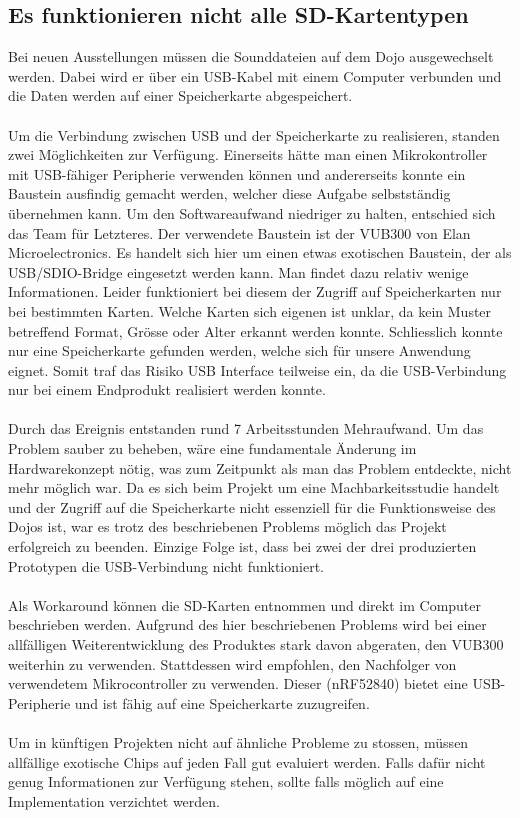 \subsection{Es funktionieren nicht alle SD-Kartentypen}
Bei neuen Ausstellungen müssen die Sounddateien auf dem Dojo ausgewechselt werden. Dabei wird er über ein USB-Kabel mit einem Computer verbunden und die Daten werden auf einer Speicherkarte abgespeichert. \\
\\
Um die Verbindung zwischen USB und der Speicherkarte zu realisieren, standen zwei Möglichkeiten zur Verfügung. Einerseits hätte man einen Mikrokontroller mit USB-fähiger Peripherie verwenden können und andererseits konnte ein Baustein ausfindig gemacht werden, welcher diese Aufgabe selbstständig übernehmen kann. Um den Softwareaufwand niedriger zu halten, entschied sich das Team für Letzteres. Der verwendete Baustein ist der VUB300 von Elan Microelectronics. Es handelt sich hier um einen etwas exotischen Baustein, der als USB/SDIO-Bridge eingesetzt werden kann. Man findet dazu relativ wenige Informationen. Leider funktioniert bei diesem der Zugriff auf Speicherkarten nur bei bestimmten Karten. Welche Karten sich eigenen ist unklar, da kein Muster betreffend Format, Grösse oder Alter erkannt werden konnte.  Schliesslich konnte nur eine Speicherkarte gefunden werden, welche sich für unsere Anwendung eignet. Somit traf das Risiko USB Interface teilweise ein, da die USB-Verbindung nur bei einem Endprodukt realisiert werden konnte.  \\
\\
Durch das Ereignis entstanden rund 7 Arbeitsstunden Mehraufwand.  Um das Problem sauber zu beheben, wäre eine fundamentale Änderung im Hardwarekonzept nötig, was zum Zeitpunkt als man das Problem entdeckte, nicht mehr möglich war. Da es sich beim Projekt um eine Machbarkeitsstudie handelt und der Zugriff auf die Speicherkarte nicht essenziell für die Funktionsweise des Dojos ist, war es trotz des beschriebenen Problems möglich das Projekt erfolgreich zu beenden.  Einzige Folge ist, dass bei zwei der drei produzierten Prototypen die USB-Verbindung nicht funktioniert.\\
\\
Als Workaround können die SD-Karten entnommen und direkt im Computer beschrieben werden. Aufgrund des hier beschriebenen Problems wird bei einer allfälligen Weiterentwicklung des Produktes stark davon abgeraten, den VUB300 weiterhin zu verwenden. Stattdessen wird empfohlen, den Nachfolger von verwendetem Mikrocontroller zu verwenden. Dieser (nRF52840) bietet eine USB-Peripherie und ist fähig auf eine Speicherkarte zuzugreifen. \\
\\
Um in künftigen Projekten nicht auf ähnliche Probleme zu stossen, müssen allfällige exotische Chips auf jeden Fall gut evaluiert werden. Falls dafür nicht genug Informationen zur Verfügung stehen, sollte falls möglich auf eine Implementation verzichtet werden. 